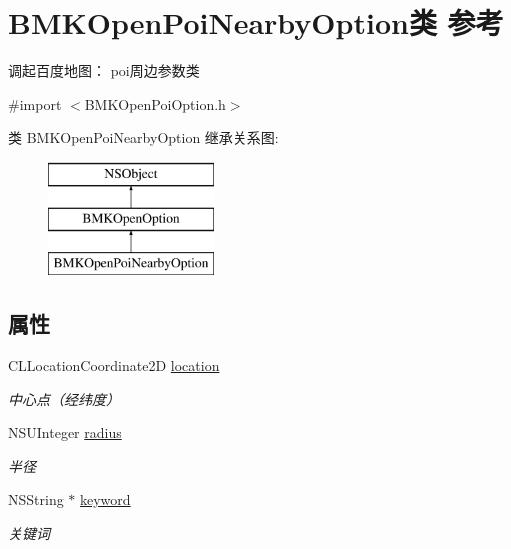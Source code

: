 \hypertarget{interface_b_m_k_open_poi_nearby_option}{}\section{B\+M\+K\+Open\+Poi\+Nearby\+Option类 参考}
\label{interface_b_m_k_open_poi_nearby_option}


调起百度地图： poi周边参数类  




{\ttfamily \#import $<$B\+M\+K\+Open\+Poi\+Option.\+h$>$}

类 B\+M\+K\+Open\+Poi\+Nearby\+Option 继承关系图\+:\begin{figure}[H]
\begin{center}
\leavevmode
\includegraphics[height=3.000000cm]{interface_b_m_k_open_poi_nearby_option}
\end{center}
\end{figure}
\subsection*{属性}
\begin{DoxyCompactItemize}
\item 
\hypertarget{interface_b_m_k_open_poi_nearby_option_ad85929b16e62c0625d7f1fda71c40f7b}{}C\+L\+Location\+Coordinate2\+D \hyperlink{interface_b_m_k_open_poi_nearby_option_ad85929b16e62c0625d7f1fda71c40f7b}{location}\label{interface_b_m_k_open_poi_nearby_option_ad85929b16e62c0625d7f1fda71c40f7b}

\begin{DoxyCompactList}\small\item\em 中心点（经纬度） \end{DoxyCompactList}\item 
\hypertarget{interface_b_m_k_open_poi_nearby_option_a3b715e8e2f57928dcb4f2f3f0035c0fb}{}N\+S\+U\+Integer \hyperlink{interface_b_m_k_open_poi_nearby_option_a3b715e8e2f57928dcb4f2f3f0035c0fb}{radius}\label{interface_b_m_k_open_poi_nearby_option_a3b715e8e2f57928dcb4f2f3f0035c0fb}

\begin{DoxyCompactList}\small\item\em 半径 \end{DoxyCompactList}\item 
\hypertarget{interface_b_m_k_open_poi_nearby_option_a3329f4e8869c4b07cef5b3b801c13de5}{}N\+S\+String $\ast$ \hyperlink{interface_b_m_k_open_poi_nearby_option_a3329f4e8869c4b07cef5b3b801c13de5}{keyword}\label{interface_b_m_k_open_poi_nearby_option_a3329f4e8869c4b07cef5b3b801c13de5}

\begin{DoxyCompactList}\small\item\em 关键词 \end{DoxyCompactList}\end{DoxyCompactItemize}



